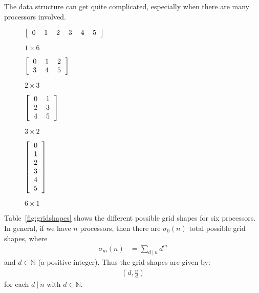 The data structure can get quite complicated, especially when there are many processors involved.
\begin{table}[ht]
        \centering
        \begin{subfigure}[b]{0.23\textwidth}
                \centering
              $\left[\begin{tabular}{llllll}
                  0 & 1 & 2 & 3 & 4 & 5
                \end{tabular}\right]$
                \caption{$1\times 6$}
        \end{subfigure}
        \begin{subfigure}[b]{0.23\textwidth}
                \centering
                $\left[\begin{tabular}{lll}
                  0 & 1 & 2\\
                  3 & 4 & 5
                \end{tabular}\right]$
                \caption{$2\times 3$}
        \end{subfigure}%
        \begin{subfigure}[b]{0.23\textwidth}
                \centering
              $\left[\begin{tabular}{ll}
                  0 & 1 \\
                  2 & 3\\
                  4 & 5
                \end{tabular}\right]$
                \caption{$3\times 2$}
        \end{subfigure}
        \begin{subfigure}[b]{0.23\textwidth}
                \centering
              $\left[\begin{tabular}{l}
                  0 \\ 1 \\ 2 \\ 3 \\ 4 \\ 5
                \end{tabular}\right]$
                \caption{$6\times 1$}
        \end{subfigure}
        \caption{Processor Grid Shapes with 6 Processors}\label{fig:gridshapes}
\end{table}
Table~\ref{fig:gridshapes} shows the different possible grid shapes for six processors.  In general, if we have $n$ processors, then there are $\sigma_0(n)$ total possible grid shapes, where
\begin{align*}
\sigma_m(n) &= \sum_{d\ |\ n} d^m
\end{align*}
and $d\in\mathbb{N}$ (a positive integer).  Thus the grid shapes are given by:
\begin{align*}
\left( d, \frac{n}{d} \right)
\end{align*}
for each $d\ |\ n$ with $d\in\mathbb{N}$.
  
